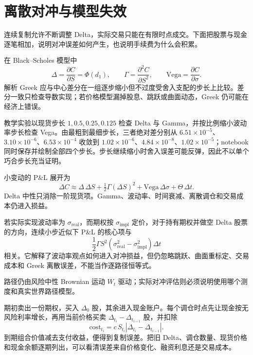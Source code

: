 \section{离散对冲与模型失效}
\label{ch:lower-derivatives-hedging}

\begin{itemize}
  
\end{itemize}

连续复制允许不断调整 Delta，实际交易只能在有限时点成交。下面把股票与现金逐笔相加，说明对冲误差如何产生，也说明手续费为什么会积累。



在 Black--Scholes 模型中
\[
 \Delta=\frac{\partial C}{\partial S}=\Phi(d_1),\qquad
 \Gamma=\frac{\partial^2C}{\partial S^2},\qquad
 \mathrm{Vega}=\frac{\partial C}{\partial\sigma}.
\]
解析 Greek 应与中心差分在一组逐步缩小但不过度受舍入支配的步长上比较。差分一致只检查导数实现；若价格模型漏掉股息、跳跃或曲面动态，Greek 仍可能在经济上错误。



教学实验以现货步长 $1,0.5,0.25,0.125$ 检查 Delta 与 Gamma，并按比例缩小波动率步长检查 Vega。由最粗到最细步长，三者绝对差分别从
$6.51\times10^{-5}$、$3.10\times10^{-6}$、$6.53\times10^{-4}$ 收敛到
$1.02\times10^{-6}$、$4.84\times10^{-8}$、$1.02\times10^{-5}$；notebook 同时保存并绘制全部四个步长。步长继续缩小时舍入误差可能反弹，因此不以单个巧合步长充当证明。

小变动的 P\&L 展开为
\[
 \Delta C\approx \Delta\,\Delta S+\tfrac12\Gamma(\Delta S)^2
 +\mathrm{Vega}\,\Delta\sigma+\Theta\,\Delta t.
\]
Delta 中性只消除一阶现货项。Gamma、波动率、时间衰减、离散调仓和交易成本仍进入损益。

若实际实现波动率为 $\sigma_{\mathrm{real}}$，而期权按 $\sigma_{\mathrm{impl}}$ 定价，对于持有期权并做空 Delta 股票的方向，连续小步近似下 P\&L 的核心项与
\[
 \frac12\Gamma S^2\left(\sigma_{\mathrm{real}}^2-\sigma_{\mathrm{impl}}^2\right)\Delta t
\]
相关。它解释了波动率观点如何进入对冲损益，但仍忽略跳跃、曲面重标定、交易成本和 Greek 离散误差，不能当作逐路径恒等式。


路径仍由风险中性 Brownian 运动 $W_t$ 驱动；实际对冲评估则必须说明使用哪个测度和真实世界路径模型。

期初卖出一份期权，买入 $\Delta_0$ 股，其余进入现金账户。每个调仓时点先让现金按无风险利率增长，再用当前价格买卖 $\Delta_{t_i}-\Delta_{t_{i-1}}$ 股，并扣除
\[
 \mathrm{cost}_{t_i}=c\,S_{t_i}\left|\Delta_{t_i}-\Delta_{t_{i-1}}\right|.
\]
到期组合价值减去支付收益，便得到复制误差。把旧 Delta、调仓数量、现货价格和现金余额逐期列出，可以看清误差来自价格变化、融资利息还是交易成本。

